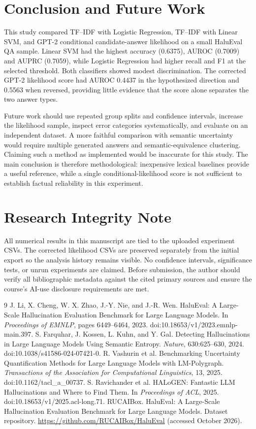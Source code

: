 \documentclass[11pt]{article}
\begin{document}
\section{Conclusion and Future Work}
This study compared TF--IDF with Logistic Regression, TF--IDF with Linear SVM, and GPT-2 conditional candidate-answer likelihood on a small HaluEval QA sample. Linear SVM had the highest accuracy (0.6375), AUROC (0.7009) and AUPRC (0.7059), while Logistic Regression had higher recall and F1 at the selected threshold. Both classifiers showed modest discrimination. The corrected GPT-2 likelihood score had AUROC 0.4437 in the hypothesized direction and 0.5563 when reversed, providing little evidence that the score alone separates the two answer types.

Future work should use repeated group splits and confidence intervals, increase the likelihood sample, inspect error categories systematically, and evaluate on an independent dataset. A more faithful comparison with semantic uncertainty would require multiple generated answers and semantic-equivalence clustering. Claiming such a method as implemented would be inaccurate for this study. The main conclusion is therefore methodological: inexpensive lexical baselines provide a useful reference, while a single conditional-likelihood score is not sufficient to establish factual reliability in this experiment.

\section*{Research Integrity Note}
All numerical results in this manuscript are tied to the uploaded experiment CSVs. The corrected likelihood CSVs are preserved separately from the initial export so the analysis history remains visible. No confidence intervals, significance tests, or unrun experiments are claimed. Before submission, the author should verify all bibliographic metadata against the cited primary sources and ensure the course's AI-use disclosure requirements are met.

\begin{thebibliography}{9}
 J. Li, X. Cheng, W. X. Zhao, J.-Y. Nie, and J.-R. Wen. HaluEval: A Large-Scale Hallucination Evaluation Benchmark for Large Language Models. In \emph{Proceedings of EMNLP}, pages 6449--6464, 2023. doi:10.18653/v1/2023.emnlp-main.397.
 S. Farquhar, J. Kossen, L. Kuhn, and Y. Gal. Detecting Hallucinations in Large Language Models Using Semantic Entropy. \emph{Nature}, 630:625--630, 2024. doi:10.1038/s41586-024-07421-0.
 R. Vashurin et al. Benchmarking Uncertainty Quantification Methods for Large Language Models with LM-Polygraph. \emph{Transactions of the Association for Computational Linguistics}, 13, 2025. doi:10.1162/tacl_a_00737.
 S. Ravichander et al. HALoGEN: Fantastic LLM Hallucinations and Where to Find Them. In \emph{Proceedings of ACL}, 2025. doi:10.18653/v1/2025.acl-long.71.
 RUCAIBox. HaluEval: A Large-Scale Hallucination Evaluation Benchmark for Large Language Models. Dataset repository. \url{https://github.com/RUCAIBox/HaluEval} (accessed October 2026).
\end{thebibliography}
\end{document}
